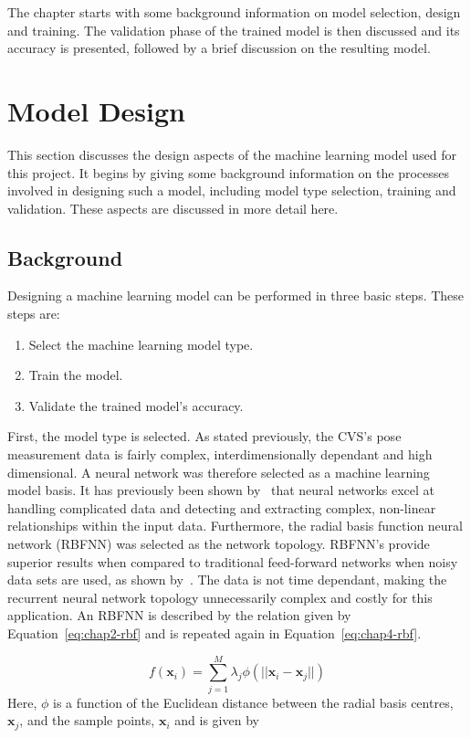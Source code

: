The chapter starts with some background information on model selection, design and training. The validation phase of the trained model is then discussed and its accuracy is presented, followed by a brief discussion on the resulting model. 

\section{Model Design}

This section discusses the design aspects of the machine learning model used for this project. It begins by giving some background information on the processes involved in designing such a model, including model type selection, training and validation. These aspects are discussed in more detail here.  

\subsection{Background}

Designing a machine learning model can be performed in three basic steps. These steps are:

\begin{enumerate}
  \item Select the machine learning model type.
  \item Train the model.
  \item Validate the trained model's accuracy. 
\end{enumerate}

First, the model type is selected. As stated previously, the CVS's pose measurement data is fairly complex, interdimensionally dependant and high dimensional. A neural network was therefore selected as a machine learning model basis. It has previously been shown by~\cite{tu1996advantages} that neural networks excel at handling complicated data and detecting and extracting complex, non-linear relationships within the input data. Furthermore, the radial basis function neural network (RBFNN) was selected as the network topology. RBFNN's provide superior results when compared to traditional feed-forward networks when noisy data sets are used, as shown by~\cite{xie2011comparison}. The data is not time dependant, making the recurrent neural network topology unnecessarily complex and costly for this application. An RBFNN is described by the relation given by Equation~\ref{eq:chap2-rbf} and is repeated again in Equation~\ref{eq:chap4-rbf}.

\begin{equation}
  \label{eq:chap4-rbf}
  f(\bm{x}_i) = \sum\limits_{j = 1}^{M}\lambda_j \phi(|| \bm{x}_i - \bm{x}_j ||)
\end{equation}
Here, $\phi$ is a function of the Euclidean distance between the radial basis centres, $\bm{x}_j$, and the sample points, $\bm{x}_i$ and is given by 

